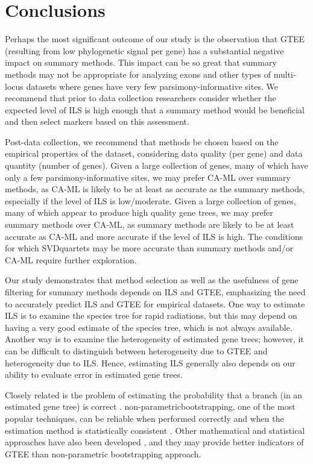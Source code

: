 \section{Conclusions}
\label{sec:include-conclusions}
Perhaps the most significant outcome of our study is the observation that GTEE (resulting from low phylogenetic signal per gene) has a substantial negative impact on summary methods. 
This impact can be so great that summary methods may not be appropriate for analyzing \glspl{exon} and other types of multi-locus datasets where genes have very few parsimony-informative sites.
We recommend that prior to data collection researchers consider whether the expected level of ILS is high enough that a summary method would be beneficial and then select markers based on this assessment.

Post-data collection, we recommend that methods be chosen based on the empirical properties of the dataset, considering data quality (per gene) and data quantity (number of genes). 
Given a large collection of genes, many of which have only a few parsimony-informative sites, we may prefer CA-ML over summary methods, as CA-ML is likely to be at least as accurate as the summary methods, especially if the level of ILS is low/moderate. 
Given a large collection of genes, many of which appear to produce high quality gene trees, we may prefer summary methods over CA-ML, as summary methods are likely to be at least accurate as CA-ML and more accurate if the level of ILS is high. 
The conditions for which SVDquartets may be more accurate than summary methods and/or CA-ML require further exploration.

Our study demonstrates that method selection as well as the usefulness of gene filtering for summary methods depends on ILS and GTEE, emphasizing the need to accurately predict ILS and GTEE for empirical datasets. 
One way to estimate ILS is to examine the species tree for rapid radiations, but this may depend on having a very good estimate of the species tree, which is not always available. 
Another way is to examine the heterogeneity of estimated gene trees; however, it can be difficult to distinguish between heterogeneity due to GTEE and heterogeneity due to ILS. 
Hence, estimating ILS generally also depends on our ability to evaluate error in estimated gene trees.

Closely related is the problem of estimating the probability that a branch (in an estimated gene tree) is correct \cite{anisimova2011survey}. 
\Gls{non-parametricbootstrapping}, one of the most popular techniques, can be reliable when performed correctly and when the estimation method is statistically consistent \cite{efron1996bootstrap, holmes2003bootstrapping, holmes2005statistical, susko2009bootstrap}. 
Other mathematical and statistical approaches have also been developed \cite{holmes2005statistical, fischer2009sequence, townsend2012phylogenetic, susko2012probability, salichos2014novel}, and they may provide better indicators of GTEE than non-parametric bootstrapping approach.

